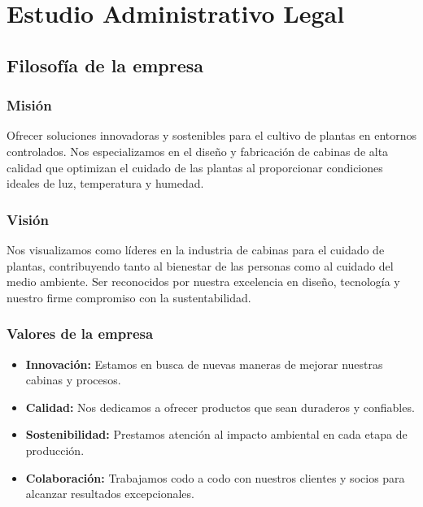 \chapter{Estudio Administrativo Legal}

\section{Filosofía de la empresa}

\subsection{Misión}


Ofrecer soluciones innovadoras y sostenibles para el cultivo de plantas en entornos controlados. Nos especializamos en el diseño y fabricación de cabinas de alta calidad que optimizan el cuidado de las plantas al proporcionar condiciones ideales de luz, temperatura y humedad.



\subsection{Visión}

Nos visualizamos como líderes en la industria de cabinas para el cuidado de plantas, contribuyendo tanto al bienestar de las personas como al cuidado del medio ambiente. Ser reconocidos por nuestra excelencia en diseño, tecnología y nuestro firme compromiso con la sustentabilidad.


\subsection{Valores de la empresa}

\begin{itemize}

 \item \textbf{Innovación:} Estamos en busca de nuevas maneras de mejorar nuestras cabinas y procesos.
    \item \textbf{Calidad:} Nos dedicamos a ofrecer productos que sean duraderos y confiables.
    \item \textbf{Sostenibilidad:} Prestamos atención al impacto ambiental en cada etapa de producción.
    \item \textbf{Colaboración:} Trabajamos codo a codo con nuestros clientes y socios para alcanzar resultados excepcionales.

\end{itemize}

